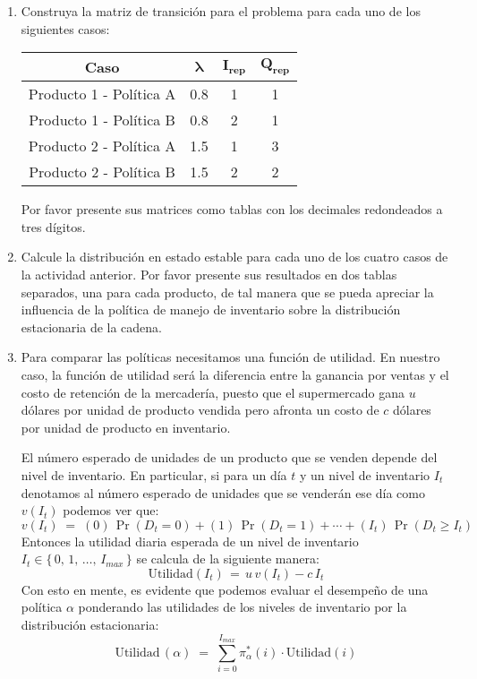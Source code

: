\documentclass[ a4paper, twoside, 11pt]{article}
\begin{document}
\begin{problem}
\begin{enumerate}[label=\textbf{\alph*)}]
\item Construya la matriz de transici\'on para el problema para cada uno de los siguientes casos: 
\begin{table}[htb]
\centering
\begin{tabular}{|c|c|c|c|}
\hline
\textbf{Caso}           & $\bm{\lambda}$ & $\bm{I_{rep}}$ & $\bm{Q_{rep}}$ \\ \hline
Producto 1 - Pol\'itica A & 0.8 & 1  & 1                  \\ \hline
Producto 1 - Pol\'itica B & 0.8 & 2  & 1                  \\ \hline
Producto 2 - Pol\'itica A & 1.5 & 1  & 3                  \\ \hline
Producto 2 - Pol\'itica B & 1.5 & 2  & 2                  \\ \hline
\end{tabular}
\end{table}
Por favor presente sus matrices como tablas con los decimales redondeados a tres d\'igitos. 

\item Calcule la distribuci\'on en estado estable para cada uno de los cuatro casos de la actividad anterior. Por favor presente sus resultados en dos tablas separados, una para cada producto, de tal manera que se pueda apreciar la influencia de la pol\'itica de manejo de inventario sobre la distribuci\'on estacionaria de la cadena. 

\item Para comparar las pol\'iticas necesitamos una funci\'on de utilidad. En nuestro caso, la funci\'on de utilidad ser\'a la diferencia entre la ganancia por ventas y el costo de retenci\'on de la mercader\'ia, puesto que el supermercado gana $u$ d\'olares por unidad de producto vendida pero afronta un costo de $c$ d\'olares por unidad de producto en inventario. 

El n\'umero esperado de unidades de un producto que se venden depende del nivel de inventario. En particular, si para un d\'ia $t$ y un nivel de inventario $I_t$ denotamos al n\'umero esperado de unidades que se vender\'an ese d\'ia como $v(I_t)$ podemos ver que: 
\[
v(I_t) \; = \; (0) \, \Pr( D_t = 0 ) + (1) \, \Pr( D_t = 1 ) + \cdots + (I_t) \, \Pr( D_t \geq I_t )
\]
Entonces la utilidad diaria esperada de un nivel de inventario $I_t \in \{ \, 0, \, 1, \, \dots, \, I_{max} \, \}$ se calcula de la siguiente manera: 
\[
\text{Utilidad}(I_t) \, = \, u \, v(I_t) - c \, I_t
\]
Con esto en mente, es evidente que podemos evaluar el desempe\~no de una pol\'itica $\alpha$ ponderando las utilidades de los niveles de inventario por la distribuci\'on estacionaria: 
\[
\text{Utilidad} \, (\alpha) \; = \; 
\sum_{ i = 0 }^{I_{max}} \pi^*_{\alpha}(i) \cdot \text{Utilidad}(i)
\]


\end{enumerate}
\end{problem}
\end{document}
